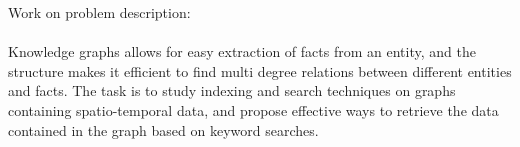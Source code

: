 Work on problem description:\\
\\
Knowledge graphs allows for easy extraction of facts from an entity, and the structure makes it efficient to find multi degree relations between different entities and facts. The task is to study indexing and search techniques on graphs containing spatio-temporal data, and propose effective ways to retrieve the data contained in the graph based on keyword searches.
\\
\\

\clearpage